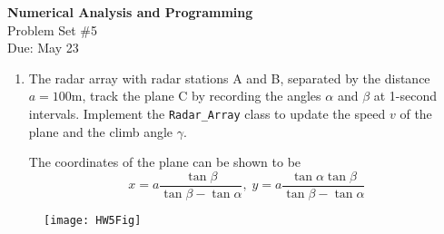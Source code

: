 \documentclass[12pt]{article}
\begin{document}
\begin{center}
\Large
\textbf{Numerical Analysis and Programming}\\
\large
Problem Set \#5\\
Due: May 23
\end{center}
\begin{enumerate}
\item The radar array with radar stations A and B, separated by the distance $a=100$m, track the plane C by recording the angles $\alpha$ and $\beta$ at 1-second intervals. Implement the \verb!Radar_Array! class to  update the speed $v$ of the plane and the climb angle $\gamma$. 

The coordinates of the plane can be shown to be 
\[
x=a\frac{\tan \beta}{\tan \beta-\tan \alpha},\; y=a\frac{\tan\alpha \tan \beta}{\tan \beta-\tan \alpha}
\]
\end{enumerate}
\begin{figure}[hbp]
\centerline{\texttt{[image: HW5Fig]}}
\end{figure}
\end{document}
